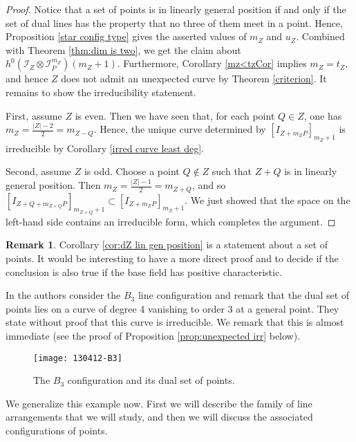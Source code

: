 \documentclass[12pt]{amsart}
\numberwithin{equation}{section}
\theoremstyle{definition}
\newtheorem{remark}[theorem]{Remark}
\begin{document}
\begin{proof} 
Notice that a set of points is in linearly general position if and only if the set of dual lines has the property that no three of them meet in a point. Hence, Proposition \ref{star config type} gives the asserted values of $m_Z$ and $u_Z$. Combined with Theorem \ref{thm:dim is two}, we get the claim about $h^0(\mathcal I_Z \otimes \mathcal I_P^{m_Z})(m_Z+1)$. Furthermore, Corollary \ref{mz<tzCor} implies $m_Z = t_Z$, and hence $Z$ does not admit an unexpected curve by Theorem \ref{criterion}. It remains to show the irreducibility statement. 

First, assume $Z$ is even. Then we have seen that, for each point $Q \in Z$, one has 
$m_Z = \frac{|Z|-2}{2} = m_{Z-Q}$. Hence, the unique curve determined by $[I_{Z + m_Z P}]_{m_Z +1}$ is irreducible by Corollary \ref{irred curve least deg}. 

Second, assume $Z$ is odd. Choose a point $Q \notin Z$ such that $Z + Q$ is in linearly general position. Then $m_Z = \frac{|Z|-1}{2} = m_{Z+Q}$, and so $[I_{Z + Q + m_{Z + Q} P}]_{m_{Z+Q} +1} \subset [I_{Z + m_Z P}]_{m_Z +1}$. We just showed that the space on the left-hand side contains an irreducible form, which completes the argument. 
\end{proof} 

\begin{remark}
Corollary \ref{cor:dZ lin gen position} is a statement about a set of points. 
It would be interesting to have a more direct proof and to decide if the conclusion is also true if the base field has positive characteristic. 
\end{remark} 

In \cite[Proposition 7.3]{DIV} the authors consider the $B_3$ line configuration and remark that the dual set of points lies on a curve of degree 4 vanishing to order 3 at a general point. They state without proof that this curve is irreducible. We remark that this is almost immediate (see the proof of Proposition \ref{prop:unexpected irr} below). 

\begin{figure}[!ht]
    \texttt{[image: 130412-B3]}
    \caption{The $B_3$ configuration and its dual set of points.}
    \label{fig:B3}
\end{figure}

We generalize this example now. First we will  describe the family of  line arrangements that we will study, and then we will discuss the associated configurations of points.
\end{document}
